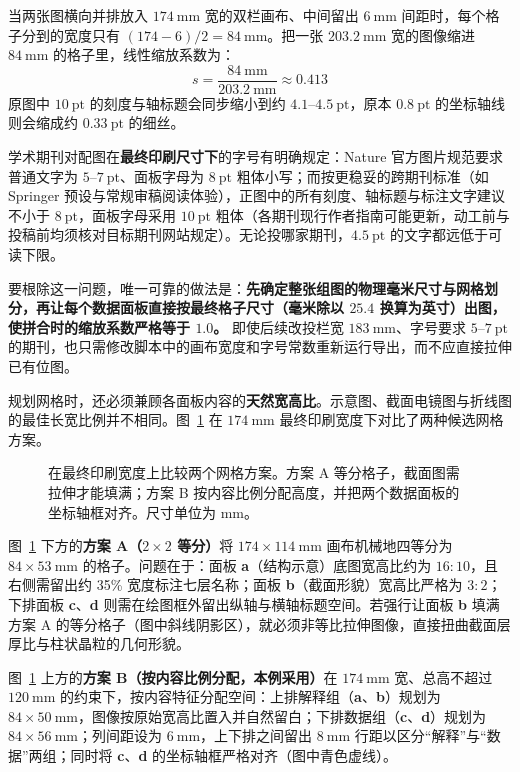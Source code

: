 当两张图横向并排放入 $174\ \text{mm}$ 宽的双栏画布、中间留出 $6\ \text{mm}$ 间距时，每个格子分到的宽度只有 $(174 - 6) / 2 = 84\ \text{mm}$。把一张 $203.2\ \text{mm}$ 宽的图像缩进 $84\ \text{mm}$ 的格子里，线性缩放系数为：
\[
s = \frac{84\ \text{mm}}{203.2\ \text{mm}} \approx 0.413
\]
原图中 $10\ \text{pt}$ 的刻度与轴标题会同步缩小到约 $4.1\text{--}4.5\ \text{pt}$，原本 $0.8\ \text{pt}$ 的坐标轴线则会缩成约 $0.33\ \text{pt}$ 的细丝。

学术期刊对配图在\textbf{最终印刷尺寸下}的字号有明确规定：Nature 官方图片规范要求普通文字为 $5\text{--}7\ \text{pt}$、面板字母为 $8\ \text{pt}$ 粗体小写；而按更稳妥的跨期刊标准（如 Springer 预设与常规审稿阅读体验），正图中的所有刻度、轴标题与标注文字建议不小于 $8\ \text{pt}$，面板字母采用 $10\ \text{pt}$ 粗体（各期刊现行作者指南可能更新，动工前与投稿前均须核对目标期刊网站规定）。无论投哪家期刊，$4.5\ \text{pt}$ 的文字都远低于可读下限。

要根除这一问题，唯一可靠的做法是：\textbf{先确定整张组图的物理毫米尺寸与网格划分，再让每个数据面板直接按最终格子尺寸（毫米除以 $25.4$ 换算为英寸）出图，使拼合时的缩放系数严格等于 $1.0$。} 即使后续改投栏宽 $183\ \text{mm}$、字号要求 $5\text{--}7\ \text{pt}$ 的期刊，也只需修改脚本中的画布宽度和字号常数重新运行导出，而不应直接拉伸已有位图。

规划网格时，还必须兼顾各面板内容的\textbf{天然宽高比}。示意图、截面电镜图与折线图的最佳长宽比例并不相同。图~\ref{fig:ch09-02} 在 $174\ \text{mm}$ 最终印刷宽度下对比了两种候选网格方案。

\begin{figure}[htbp]\centering
\resizebox{0.84\linewidth}{!}{}
\caption{在最终印刷宽度上比较两个网格方案。方案 A 等分格子，截面图需拉伸才能填满；方案 B 按内容比例分配高度，并把两个数据面板的坐标轴框对齐。尺寸单位为 mm。}\label{fig:ch09-02}
\end{figure}

图~\ref{fig:ch09-02} 下方的\textbf{方案 A（$2 \times 2$ 等分）}将 $174 \times 114\ \text{mm}$ 画布机械地四等分为 $84 \times 53\ \text{mm}$ 的格子。问题在于：面板 \textbf{a}（结构示意）底图宽高比约为 $16:10$，且右侧需留出约 35\% 宽度标注七层名称；面板 \textbf{b}（截面形貌）宽高比严格为 $3:2$；下排面板 \textbf{c}、\textbf{d} 则需在绘图框外留出纵轴与横轴标题空间。若强行让面板 \textbf{b} 填满方案 A 的等分格子（图中斜线阴影区），就必须非等比拉伸图像，直接扭曲截面层厚比与柱状晶粒的几何形貌。

图~\ref{fig:ch09-02} 上方的\textbf{方案 B（按内容比例分配，本例采用）}在 $174\ \text{mm}$ 宽、总高不超过 $120\ \text{mm}$ 的约束下，按内容特征分配空间：上排解释组（\textbf{a}、\textbf{b}）规划为 $84 \times 50\ \text{mm}$，图像按原始宽高比置入并自然留白；下排数据组（\textbf{c}、\textbf{d}）规划为 $84 \times 56\ \text{mm}$；列间距设为 $6\ \text{mm}$，上下排之间留出 $8\ \text{mm}$ 行距以区分“解释”与“数据”两组；同时将 \textbf{c}、\textbf{d} 的坐标轴框严格对齐（图中青色虚线）。

